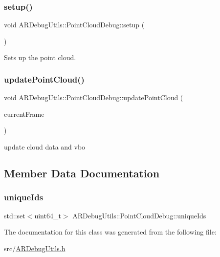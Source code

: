\subsubsection{\texorpdfstring{setup()}{setup()}}
{\footnotesize\ttfamily void A\+R\+Debug\+Utils\+::\+Point\+Cloud\+Debug\+::setup (\begin{DoxyParamCaption}{ }\end{DoxyParamCaption})\hspace{0.3cm}{\ttfamily [inline]}}



Sets up the point cloud. 

\mbox{\label{class_a_r_debug_utils_1_1_point_cloud_debug_a02a8d4c24ec4b19c238288874a568a9f}} 
\subsubsection{\texorpdfstring{update\+Point\+Cloud()}{updatePointCloud()}}
{\footnotesize\ttfamily void A\+R\+Debug\+Utils\+::\+Point\+Cloud\+Debug\+::update\+Point\+Cloud (\begin{DoxyParamCaption}\item[{A\+R\+Frame $\ast$}]{current\+Frame }\end{DoxyParamCaption})\hspace{0.3cm}{\ttfamily [inline]}}



update cloud data and vbo 



\subsection{Member Data Documentation}
\mbox{\label{class_a_r_debug_utils_1_1_point_cloud_debug_a6405deec8e383af9b59593e7e207d1cf}} 
\subsubsection{\texorpdfstring{unique\+Ids}{uniqueIds}}
{\footnotesize\ttfamily std\+::set$<$uint64\+\_\+t$>$ A\+R\+Debug\+Utils\+::\+Point\+Cloud\+Debug\+::unique\+Ids}



The documentation for this class was generated from the following file\+:\begin{DoxyCompactItemize}
\item 
src/\hyperlink{_a_r_debug_utils_8h}{A\+R\+Debug\+Utils.\+h}\end{DoxyCompactItemize}
